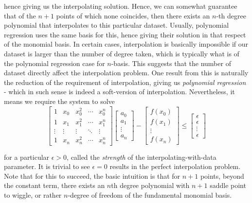 \documentclass[10pt]{article} %
\begin{document}
hence giving us the interpolating solution. Hence, we can somewhat guarantee that of the $n+1$ points of which none coincides, then there exists an $n$-th degree polynomial that interpolates to this particular dataset. Usually, polynomial regression uses the same basis for this, hence giving their solution in that respect of the monomial basis. In certain cases, interpolation is basically impossible if our dataset is larger than the number of degree taken, which is typically what is of the polynomial regression case for $n$-basis. This suggests that the number of dataset directly affect the interpolation problem. One result from this is naturally the reduction of the requirement of interpolation, giving us \textit{polynomial regression} - which in such sense is indeed a soft-version of interpolation. Nevertheless, it means we require the system to solve 
\begin{equation}\label{eq:soft_hard_interpolation}
\begin{bmatrix}
1 & x_0 & x_0^2 & \cdots & x_0^n \\
1 & x_1 & x_1^2 & \cdots & x_1^n \\
\vdots & \vdots & \vdots & \ddots & \vdots \\
1 & x_n & x_n^2 & \cdots & x_n^n
\end{bmatrix}
\begin{bmatrix}
a_0 \\
a_1 \\
\vdots \\
a_n
\end{bmatrix}
- 
\begin{bmatrix}
f(x_0) \\
f(x_1) \\
\vdots \\
f(x_n)
\end{bmatrix}
\leq 
\begin{bmatrix}
  \epsilon\\
  \epsilon \\
  \vdots \\
  \epsilon
\end{bmatrix}
\end{equation}

for a particular $\epsilon > 0$, called the \textit{strength} of the interpolating-with-data parameter. It is trivial to see $\epsilon = 0$ results in the perfect interpolation problem. Note that for this to succeed, the basic intuition is that for $n+1$ points, beyond the constant term, there exists an $n$th degree polynomial with $n+1$ saddle point to wiggle, or rather $n$-degree of freedom of the fundamental monomial basis. 
\end{document}
